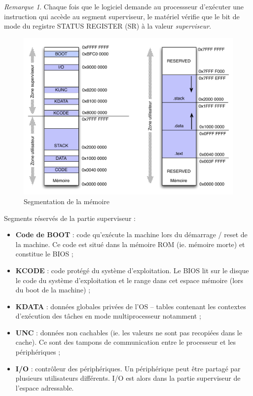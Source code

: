 \documentclass[11pt,english,french]{scrreprt}
\theoremstyle{remark}
\newtheorem*{rem*}{Remarque}
\theoremstyle{definition}
\begin{document}
\begin{rem*}
	Chaque fois que le logiciel demande au processseur d'exécuter une instruction qui accède au segment superviseur, le matériel vérifie que le bit de mode du registre STATUS REGISTER (SR) à la valeur \emph{superviseur}.
\end{rem*}

\vspace{20pt}

\begin{figure}[h!]
	\center
	\includegraphics[scale=.5]{diagrammes/Memoire2}
	\caption{Segmentation de la mémoire}
\end{figure}

Segments réservés de la partie superviseur : \begin{itemize}
	\item \textbf{Code de BOOT} : code qu'exécute la machine lors du démarrage / reset de la machine. Ce code est situé dans la mémoire ROM (ie. mémoire morte) et constitue le BIOS ;
	\item \textbf{KCODE} : code protégé du système d'exploitation. Le BIOS lit sur le disque le code du système d'exploitation et le range dans cet espace mémoire (lors du boot de la machine) ;
	\item \textbf{KDATA} : données globales privées de l'OS -- tables contenant les contextes d'exécution des tâches en mode multiprocesseur notamment ;
	\item \textbf{UNC} : données non cachables (ie. les valeurs ne sont pas recopiées dans le cache). Ce sont des tampons de communication entre le processeur et les périphériques ;
	\item \textbf{I/O} : contrôleur des périphériques. Un périphérique peut être partagé par plusieurs utilisateurs différents. I/O est alors dans la partie superviseur de l'espace adressable.
\end{itemize}
\end{document}
